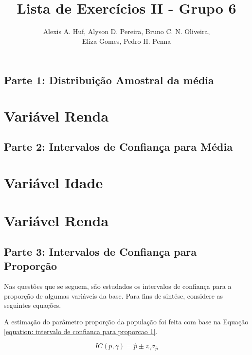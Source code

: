 \documentclass[10pt,a4paper,oneside]{article}
\author{%
	Alexis A. Huf, %
	Alyson D. Pereira, %
	Bruno C. N. Oliveira,\\%
	Eliza Gomes, %
	Pedro H. Penna
	}
\title{Lista de Exercícios II - Grupo 6}
\begin{document}
\maketitle

\begin{center}
	\section*{Parte 1: Distribuição Amostral da média}
\end{center}

\section{Variável Renda}
\label{questao:1}


\begin{center}
	\section*{Parte 2: Intervalos de Confiança para Média}
\end{center}

\section{Variável Idade}
\label{questao:2}


\section{Variável Renda}
\label{questao:3}


\newpage
\begin{center}
	\section*{Parte 3: Intervalos de Confiança para Proporção}
\end{center}

	Nas questões que se seguem, são estudados os intervalos de confiança para a
	proporção de algumas variáveis da base. Para fins de sintése, considere as
	seguintes equações.
	
	A estimação do parâmetro proporção da população foi feita com base na
	Equação \ref{equation: intervalo de confianca para proporcao 1}.

		\begin{equation}
			IC(p, \gamma) = \hat{p} \pm z_\gamma \sigma_{\hat{p}}
			\label{equation: intervalo de confianca para proporcao 1}
		\end{equation}
	
\end{document}
